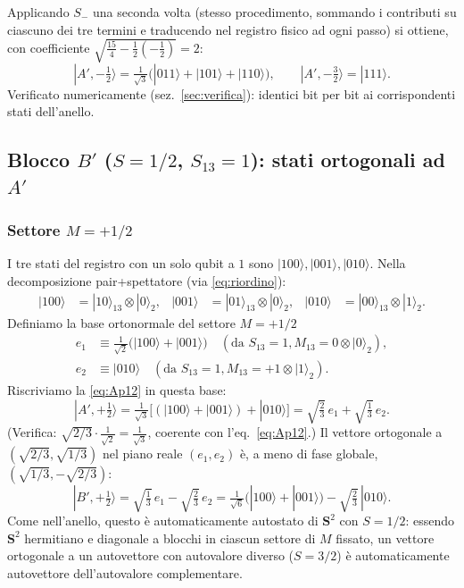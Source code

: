 \documentclass[11pt,a4paper]{article}
\begin{document}
Applicando $S_-$ una seconda volta (stesso procedimento, sommando i
contributi su ciascuno dei tre termini e traducendo nel registro fisico ad
ogni passo) si ottiene, con coefficiente $\sqrt{\tfrac{15}4-\tfrac12(-\tfrac12)}=2$:
\begin{equation}
|A',{-}\tfrac12\rangle = \tfrac1{\sqrt3}\big(|011\rangle+|101\rangle+|110\rangle\big),
\qquad
|A',{-}\tfrac32\rangle = |111\rangle .
\label{eq:Am12}
\end{equation}
Verificato numericamente (sez.~\ref{sec:verifica}): identici bit per bit ai
corrispondenti stati dell'anello.

\subsection{Blocco $B'$ ($S=1/2$, $S_{13}=1$): stati ortogonali ad $A'$}

\subsubsection{Settore $M={+}1/2$}

I tre stati del registro con un solo qubit a $1$ sono $|100\rangle,|001\rangle,|010\rangle$.
Nella decomposizione pair+spettatore (via \eqref{eq:riordino}):
\begin{align}
|100\rangle &= |10\rangle_{13}\otimes|0\rangle_2, &
|001\rangle &= |01\rangle_{13}\otimes|0\rangle_2, &
|010\rangle &= |00\rangle_{13}\otimes|1\rangle_2 .
\end{align}
Definiamo la base ortonormale del settore $M{=}{+}1/2$
\begin{align*}
e_1 &\equiv \tfrac1{\sqrt2}\big(|100\rangle+|001\rangle\big) \quad(\text{da }S_{13}{=}1,M_{13}{=}0\otimes|0\rangle_2),\\
e_2 &\equiv |010\rangle \quad(\text{da }S_{13}{=}1,M_{13}{=}{+}1\otimes|1\rangle_2).
\end{align*}
Riscriviamo la \eqref{eq:Ap12} in questa base:
\begin{equation}
|A',{+}\tfrac12\rangle = \tfrac1{\sqrt3}\big[(|100\rangle+|001\rangle)+|010\rangle\big]
= \sqrt{\tfrac23}\,e_1 + \sqrt{\tfrac13}\,e_2 .
\end{equation}
(Verifica: $\sqrt{2/3}\cdot\tfrac1{\sqrt2}=\tfrac1{\sqrt3}$, coerente con
l'eq.~\eqref{eq:Ap12}.) Il vettore ortogonale a $(\sqrt{2/3},\sqrt{1/3})$ nel
piano reale $(e_1,e_2)$ è, a meno di fase globale, $(\sqrt{1/3},-\sqrt{2/3})$:
\begin{equation}
|B',{+}\tfrac12\rangle = \sqrt{\tfrac13}\,e_1 - \sqrt{\tfrac23}\,e_2
= \tfrac1{\sqrt6}\big(|100\rangle+|001\rangle\big) - \sqrt{\tfrac23}\,|010\rangle .
\label{eq:Bp12}
\end{equation}
Come nell'anello, questo è automaticamente autostato di $\mathbf S^2$ con
$S=1/2$: essendo $\mathbf S^2$ hermitiano e diagonale a blocchi in ciascun
settore di $M$ fissato, un vettore ortogonale a un autovettore con
autovalore diverso ($S=3/2$) è automaticamente autovettore dell'autovalore
complementare.
\end{document}
